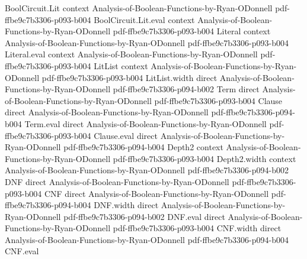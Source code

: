 \begin{theorem}
\leanok
{}
\proofstep
  {BoolCircuit.Lit}
  {context}
  {Analysis-of-Boolean-Functions-by-Ryan-ODonnell}
  {pdf-ffbe9c7b3306-p093-b004}
\proofstep
  {BoolCircuit.Lit.eval}
  {context}
  {Analysis-of-Boolean-Functions-by-Ryan-ODonnell}
  {pdf-ffbe9c7b3306-p093-b004}
\proofstep
  {Literal}
  {context}
  {Analysis-of-Boolean-Functions-by-Ryan-ODonnell}
  {pdf-ffbe9c7b3306-p093-b004}
\proofstep
  {Literal.eval}
  {context}
  {Analysis-of-Boolean-Functions-by-Ryan-ODonnell}
  {pdf-ffbe9c7b3306-p093-b004}
\proofstep
  {LitList}
  {context}
  {Analysis-of-Boolean-Functions-by-Ryan-ODonnell}
  {pdf-ffbe9c7b3306-p093-b004}
\proofstep
  {LitList.width}
  {direct}
  {Analysis-of-Boolean-Functions-by-Ryan-ODonnell}
  {pdf-ffbe9c7b3306-p094-b002}
\proofstep
  {Term}
  {direct}
  {Analysis-of-Boolean-Functions-by-Ryan-ODonnell}
  {pdf-ffbe9c7b3306-p093-b004}
\proofstep
  {Clause}
  {direct}
  {Analysis-of-Boolean-Functions-by-Ryan-ODonnell}
  {pdf-ffbe9c7b3306-p094-b004}
\proofstep
  {Term.eval}
  {direct}
  {Analysis-of-Boolean-Functions-by-Ryan-ODonnell}
  {pdf-ffbe9c7b3306-p093-b004}
\proofstep
  {Clause.eval}
  {direct}
  {Analysis-of-Boolean-Functions-by-Ryan-ODonnell}
  {pdf-ffbe9c7b3306-p094-b004}
\proofstep
  {Depth2}
  {context}
  {Analysis-of-Boolean-Functions-by-Ryan-ODonnell}
  {pdf-ffbe9c7b3306-p093-b004}
\proofstep
  {Depth2.width}
  {context}
  {Analysis-of-Boolean-Functions-by-Ryan-ODonnell}
  {pdf-ffbe9c7b3306-p094-b002}
\proofstep
  {DNF}
  {direct}
  {Analysis-of-Boolean-Functions-by-Ryan-ODonnell}
  {pdf-ffbe9c7b3306-p093-b004}
\proofstep
  {CNF}
  {direct}
  {Analysis-of-Boolean-Functions-by-Ryan-ODonnell}
  {pdf-ffbe9c7b3306-p094-b004}
\proofstep
  {DNF.width}
  {direct}
  {Analysis-of-Boolean-Functions-by-Ryan-ODonnell}
  {pdf-ffbe9c7b3306-p094-b002}
\proofstep
  {DNF.eval}
  {direct}
  {Analysis-of-Boolean-Functions-by-Ryan-ODonnell}
  {pdf-ffbe9c7b3306-p093-b004}
\proofstep
  {CNF.width}
  {direct}
  {Analysis-of-Boolean-Functions-by-Ryan-ODonnell}
  {pdf-ffbe9c7b3306-p094-b004}
\proofstep
  {CNF.eval}

\end{theorem}
